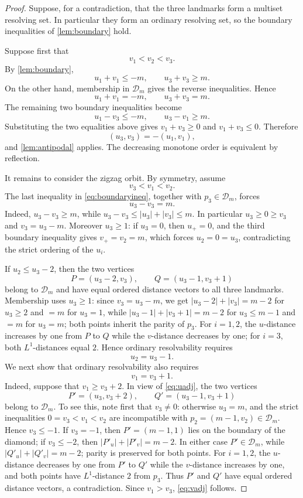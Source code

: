 \documentclass[11pt]{amsart}
\theoremstyle{remark}
\newcommand{\D}{\mathcal D}
\begin{document}
\begin{proof}
Suppose, for a contradiction, that the three landmarks form a multiset resolving set.  In particular they form an ordinary resolving set, so the boundary inequalities of \cref{lem:boundary} hold.

Suppose first that
\[
 v_1<v_2<v_3.
\]
By \cref{lem:boundary},
\[
 u_1+v_1\le -m,
 \qquad
 u_3+v_3\ge m.
\]
On the other hand, membership in $\D_m$ gives the reverse inequalities.  Hence
\[
 u_1+v_1=-m,
 \qquad
 u_3+v_3=m.
\]
The remaining two boundary inequalities become
\[
 u_1-v_3\le -m,
 \qquad
 u_3-v_1\ge m.
\]
Substituting the two equalities above gives $v_1+v_3\ge0$ and $v_1+v_3\le0$.  Therefore
\[
 (u_3,v_3)=-(u_1,v_1),
\]
and \cref{lem:antipodal} applies.  The decreasing monotone order is equivalent by reflection.

It remains to consider the zigzag orbit.  By symmetry, assume
\begin{equation}\label{eq:zigzagorder}
 v_3<v_1<v_2.
\end{equation}
The last inequality in \eqref{eq:boundaryineq}, together with $p_3\in\D_m$, forces
\begin{equation}\label{eq:p3edge}
 u_3-v_3=m.
\end{equation}
Indeed, $u_3-v_3\ge m$, while $u_3-v_3\le |u_3|+|v_3|\le m$.  In particular $u_3\ge0\ge v_3$ and $v_3=u_3-m$.  Moreover $u_3\ge1$: if $u_3=0$, then $u_+=0$, and the third boundary inequality gives $v_+=v_2=m$, which forces $u_2=0=u_3$, contradicting the strict ordering of the $u_i$.

If $u_2\le u_3-2$, then the two vertices
\[
 P=(u_3-2,v_3),
 \qquad
 Q=(u_3-1,v_3+1)
\]
belong to $\D_m$ and have equal ordered distance vectors to all three landmarks.  Membership uses $u_3\ge1$: since $v_3=u_3-m$, we get $|u_3-2|+|v_3|=m-2$ for $u_3\ge2$ and $=m$ for $u_3=1$, while $|u_3-1|+|v_3+1|=m-2$ for $u_3\le m-1$ and $=m$ for $u_3=m$; both points inherit the parity of $p_3$.  For $i=1,2$, the $u$-distance increases by one from $P$ to $Q$ while the $v$-distance decreases by one; for $i=3$, both $L^1$-distances equal $2$.  Hence ordinary resolvability requires
\begin{equation}\label{eq:uadj}
 u_2=u_3-1.
\end{equation}
We next show that ordinary resolvability also requires
\begin{equation}\label{eq:vadj}
 v_1=v_3+1.
\end{equation}
Indeed, suppose that $v_1\ge v_3+2$.  In view of \eqref{eq:uadj}, the two vertices
\[
 P'=(u_3,v_3+2),
 \qquad
 Q'=(u_3-1,v_3+1)
\]
belong to $\D_m$.  To see this, note first that $v_3\ne0$: otherwise $u_3=m$, and the strict inequalities $0=v_3<v_1<v_2$ are incompatible with $p_2=(m-1,v_2)\in\D_m$.  Hence $v_3\le-1$.  If $v_3=-1$, then $P'=(m-1,1)$ lies on the boundary of the diamond; if $v_3\le-2$, then $|P'_u|+|P'_v|=m-2$.  In either case $P'\in\D_m$, while $|Q'_u|+|Q'_v|=m-2$; parity is preserved for both points.  For $i=1,2$, the $u$-distance decreases by one from $P'$ to $Q'$ while the $v$-distance increases by one, and both points have $L^1$-distance $2$ from $p_3$.  Thus $P'$ and $Q'$ have equal ordered distance vectors, a contradiction.  Since $v_1>v_3$, \eqref{eq:vadj} follows.


\end{proof}
\end{document}
